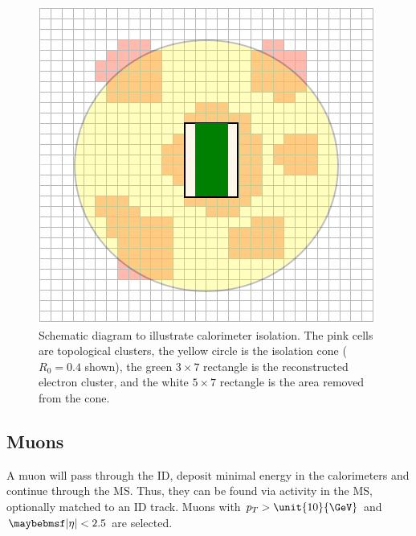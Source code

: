 \begin{figure}
	\includegraphics[width=\smallfigwidth]{tex/selection/el_isolation}
	\caption{Schematic diagram to illustrate calorimeter isolation. The pink cells are 
	topological clusters, the yellow circle is the isolation cone ($R_0 = 0.4$ shown), 
	the green $3 \times 7$ rectangle is the reconstructed electron cluster, and the white 
	$5 \times 7$ rectangle is the area removed from the cone.}
	\label{fig:objects:el_iso}
\end{figure}



\subsection{Muons}
\label{sec:objects:muons}

A muon will pass through the \ac{ID}, deposit minimal energy in the calorimeters and 
continue through the \ac{MS}. Thus, they can be found via activity in the \ac{MS}, 
optionally matched to an \ac{ID} track. Muons with $p_T > \unit{10}{\GeV}$ and 
$\mods{\eta} < 2.5$ are selected.


